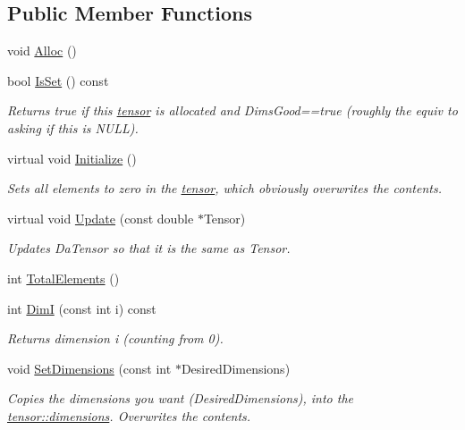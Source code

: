 \subsection*{Public Member Functions}
\begin{DoxyCompactItemize}
\item 
void \hyperlink{classJKBuilder_1_1tensor_a0ca5cbe96d2a61f06ae4b543ef84f166}{Alloc} ()
\item 
bool \hyperlink{classJKBuilder_1_1tensor_a79c9a36acc5dbeab94033ca97971dc09}{IsSet} () const 
\begin{DoxyCompactList}\small\item\em Returns true if this \hyperlink{classJKBuilder_1_1tensor}{tensor} is allocated and DimsGood==true (roughly the equiv to asking if this is NULL). \item\end{DoxyCompactList}\item 
virtual void \hyperlink{classJKBuilder_1_1tensor_a98b1050f09da390896f964fb7a892391}{Initialize} ()
\begin{DoxyCompactList}\small\item\em Sets all elements to zero in the \hyperlink{classJKBuilder_1_1tensor}{tensor}, which obviously overwrites the contents. \item\end{DoxyCompactList}\item 
virtual void \hyperlink{classJKBuilder_1_1tensor_a10ffea2bf428adfa3e8319646c44a3c6}{Update} (const double $\ast$Tensor)
\begin{DoxyCompactList}\small\item\em Updates DaTensor so that it is the same as Tensor. \item\end{DoxyCompactList}\item 
int \hyperlink{classJKBuilder_1_1tensor_a537b2f14296e2f0e62f00e1703c5fa08}{TotalElements} ()
\item 
int \hyperlink{classJKBuilder_1_1tensor_a6bdcfca6493bc217b607317dbceb28b2}{DimI} (const int i) const 
\begin{DoxyCompactList}\small\item\em Returns dimension i (counting from 0). \item\end{DoxyCompactList}\item 
void \hyperlink{classJKBuilder_1_1tensor_ace6bcf62c74395ab9e37abc4935f66e0}{SetDimensions} (const int $\ast$DesiredDimensions)
\begin{DoxyCompactList}\small\item\em Copies the dimensions you want (DesiredDimensions), into the \hyperlink{classJKBuilder_1_1tensor_a2ce1e6e0782ddee097f2c4aa2663d3e9}{tensor::dimensions}. Overwrites the contents. \item\end{DoxyCompactList}\item 

\end{DoxyCompactItemize}

